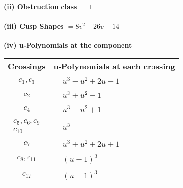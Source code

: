 \documentclass[1p]{elsarticle_modified}
\theoremstyle{definition}
\begin{document}
\flushleft \textbf{(ii) Obstruction class $= 1$}\\~\\
\flushleft \textbf{(iii) Cusp Shapes $= 8 v^2-26 v-14$}\\~\\
\newpage\renewcommand{\arraystretch}{1}
\flushleft \textbf{(iv) u-Polynomials at the component}\newline \\
\begin{tabular}{m{50pt}|m{274pt}}
Crossings & \hspace{64pt}u-Polynomials at each crossing \\
\hline $$\begin{aligned}c_{1},c_{3}\end{aligned}$$&$\begin{aligned}
&u^3- u^2+2 u-1
\end{aligned}$\\
\hline $$\begin{aligned}c_{2}\end{aligned}$$&$\begin{aligned}
&u^3+u^2-1
\end{aligned}$\\
\hline $$\begin{aligned}c_{4}\end{aligned}$$&$\begin{aligned}
&u^3- u^2+1
\end{aligned}$\\
\hline $$\begin{aligned}c_{5},c_{6},c_{9}\\c_{10}\end{aligned}$$&$\begin{aligned}
&u^3
\end{aligned}$\\
\hline $$\begin{aligned}c_{7}\end{aligned}$$&$\begin{aligned}
&u^3+u^2+2 u+1
\end{aligned}$\\
\hline $$\begin{aligned}c_{8},c_{11}\end{aligned}$$&$\begin{aligned}
&(u+1)^3
\end{aligned}$\\
\hline $$\begin{aligned}c_{12}\end{aligned}$$&$\begin{aligned}
&(u-1)^3
\end{aligned}$\\
\hline
\end{tabular}\\~\\
\end{document}
